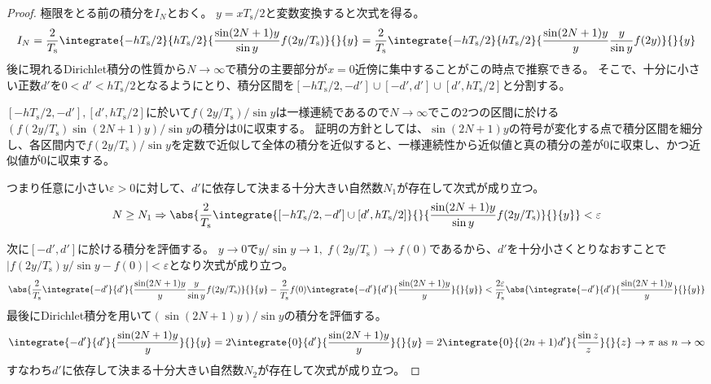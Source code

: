         \begin{proof}
            \quad\par
            極限をとる前の積分を$I_N$とおく。
            $y = x T_\text{s}/2$と変数変換すると次式を得る。
            \[
                I_N = \frac{2}{T_\text{s}}\integrate{-h T_\text{s}/2}{h T_\text{s}/2}{\frac{\sin(2N+1)y}{\sin y}f(2y/T_\text{s})}{}{y} = \frac{2}{T_\text{s}}\integrate{-h T_\text{s}/2}{h T_\text{s}/2}{\frac{\sin(2N+1)y}{y}\frac{y}{\sin y}f(2y)}{}{y}
            \]
            後に現れるDirichlet積分の性質から$N\to\infty$で積分の主要部分が$x=0$近傍に集中することがこの時点で推察できる。
            そこで、十分に小さい正数$d'$を$0<d'<h T_\text{s}/2$となるようにとり、積分区間を$[-h T_\text{s}/2,-d']\cup[-d',d']\cup[d',h T_\text{s}/2]$と分割する。
            \par
            $[-h T_\text{s}/2,-d'], [d',h T_\text{s}/2]$に於いて$f(2y/T_\text{s})/\sin y$は一様連続であるので$N\to\infty$でこの2つの区間に於ける$(f(2y/T_\text{s})\sin(2N+1)y)/\sin y$の積分は0に収束する。
            証明の方針としては、$\sin(2N+1)y$の符号が変化する点で積分区間を細分し、各区間内で$f(2y/T_\text{s})/\sin y$を定数で近似して全体の積分を近似すると、一様連続性から近似値と真の積分の差が0に収束し、かつ近似値が0に収束する。
            \par
            つまり任意に小さい$\varepsilon>0$に対して、$d'$に依存して決まる十分大きい自然数$N_1$が存在して次式が成り立つ。
            \[
                N\geq N_1 \Rightarrow \abs{\frac{2}{T_\text{s}}\integrate{[-h T_\text{s}/2,-d']\cup[d',h T_\text{s}/2]}{}{\frac{\sin(2N+1)y}{\sin y}f(2y/T_\text{s})}{}{y}}<\varepsilon
            \]
            \par
            次に$[-d',d']$に於ける積分を評価する。
            $y\to 0$で$y/\sin y\to 1,\;f(2y/T_\text{s})\to f(0)$であるから、$d'$を十分小さくとりなおすことで$|f(2y/T_\text{s})y/\sin y - f(0)| < \varepsilon$となり次式が成り立つ。
            \[
                \abs{\frac{2}{T_\text{s}}\integrate{-d'}{d'}{\frac{\sin(2N+1)y}{y}\frac{y}{\sin y}f(2y/T_\text{s})}{}{y} - \frac{2}{T_\text{s}}f(0)\integrate{-d'}{d'}{\frac{\sin(2N+1)y}{y}}{}{y}} < \frac{2\varepsilon}{T_\text{s}}\abs{\integrate{-d'}{d'}{\frac{\sin(2N+1)y}{y}}{}{y}}
            \]
            最後にDirichlet積分を用いて$(\sin(2N+1)y)/\sin y$の積分を評価する。
            \[
                \integrate{-d'}{d'}{\frac{\sin(2N+1)y}{y}}{}{y} = 2\integrate{0}{d'}{\frac{\sin(2N+1)y}{y}}{}{y} = 2\integrate{0}{(2n+1)d'}{\frac{\sin z}{z}}{}{z} \to \pi \text{ as } n\to\infty
            \]
            すなわち$d'$に依存して決まる十分大きい自然数$N_2$が存在して次式が成り立つ。

\end{proof}
